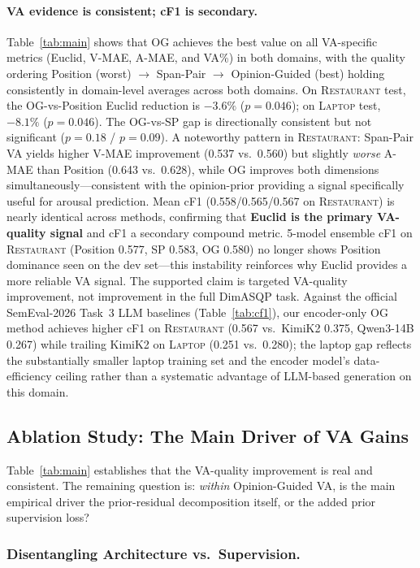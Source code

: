 \documentclass[runningheads]{llncs}
\newcommand{\restaurant}{{\normalfont\textsc{Restaurant}}}
\newcommand{\laptop}{{\normalfont\textsc{Laptop}}}
\begin{document}
\paragraph{VA evidence is consistent; cF1 is secondary.}
Table~\ref{tab:main} shows that OG achieves the best value on all VA-specific metrics (Euclid, V-MAE, A-MAE, and VA\%) in both domains, with the quality ordering Position (worst) $\to$ Span-Pair $\to$ Opinion-Guided (best) holding consistently in domain-level averages across both domains. On \restaurant{} test, the OG-vs-Position Euclid reduction is $-3.6\%$ ($p = 0.046$); on \laptop{} test, $-8.1\%$ ($p = 0.046$). The OG-vs-SP gap is directionally consistent but not significant ($p = 0.18$ / $p = 0.09$). A noteworthy pattern in \restaurant{}: Span-Pair VA yields higher V-MAE improvement (0.537 vs.\ 0.560) but slightly \emph{worse} A-MAE than Position (0.643 vs.\ 0.628), while OG improves both dimensions simultaneously---consistent with the opinion-prior providing a signal specifically useful for arousal prediction. Mean cF1 (0.558/0.565/0.567 on \restaurant{}) is nearly identical across methods, confirming that \textbf{Euclid is the primary VA-quality signal} and cF1 a secondary compound metric. 5-model ensemble cF1 on \restaurant{} (Position 0.577, SP 0.583, OG 0.580) no longer shows Position dominance seen on the dev set---this instability reinforces why Euclid provides a more reliable VA signal. The supported claim is targeted VA-quality improvement, not improvement in the full DimASQP task. Against the official SemEval-2026 Task~3 LLM baselines (Table~\ref{tab:cf1}), our encoder-only OG method achieves higher cF1 on \restaurant{} (0.567 vs.\ KimiK2 0.375, Qwen3-14B 0.267) while trailing KimiK2 on \laptop{} (0.251 vs.\ 0.280); the laptop gap reflects the substantially smaller laptop training set and the encoder model's data-efficiency ceiling rather than a systematic advantage of LLM-based generation on this domain.

\subsection{Ablation Study: The Main Driver of VA Gains}
\label{sec:ablation}

Table~\ref{tab:main} establishes that the VA-quality improvement is real and consistent. The remaining question is: \emph{within} Opinion-Guided VA, is the main empirical driver the prior-residual decomposition itself, or the added prior supervision loss?

\subsubsection{Disentangling Architecture vs.\ Supervision.}
\end{document}
